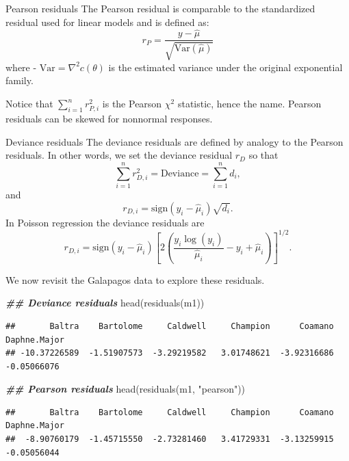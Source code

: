 \documentclass[
  ignorenonframetext,
]{beamer}
\newenvironment{Shaded}{\begin{snugshade}}{\end{snugshade}}
\newcommand{\DocumentationTok}[1]{\textcolor[rgb]{0.56,0.35,0.01}{\textbf{\textit{#1}}}}
\newcommand{\FunctionTok}[1]{\textcolor[rgb]{0.00,0.00,0.00}{#1}}
\newcommand{\NormalTok}[1]{#1}
\newcommand{\StringTok}[1]{\textcolor[rgb]{0.31,0.60,0.02}{#1}}
\begin{document}
\begin{frame}{Pearson residuals}
\protect\hypertarget{pearson-residuals}{}
The Pearson residual is comparable to the standardized residual used for
linear models and is defined as: \[
  r_P = \frac{y - \hat\mu}{\sqrt{\mathrm{Var}(\hat\mu)}}
\] where - \(\mathrm{Var} = \nabla^2 c(\theta)\) is the estimated
variance under the original exponential family.

\vspace{12pt}

Notice that \(\sum_{i=1}^n r_{P,i}^2\) is the Pearson \(\chi^2\)
statistic, hence the name. Pearson residuals can be skewed for nonnormal
responses.
\end{frame}

\begin{frame}{Deviance residuals}
\protect\hypertarget{deviance-residuals}{}
The deviance residuals are defined by analogy to the Pearson residuals.
In other words, we set the deviance residual \(r_D\) so that \[
  \sum_{i=1}^n r_{D,i}^2 = \text{Deviance} = \sum_{i=1}^n d_i,
\] and \[
  r_{D,i} = \text{sign}(y_i - \hat\mu_i)\sqrt{d_i}.
\] In Poisson regression the deviance residuals are \[
  r_{D,i} = \text{sign}(y_i - \hat\mu_i)\left[2\left(\frac{y_i\log(y_i)}{\hat\mu_i} - y_i + \hat\mu_i\right)\right]^{1/2}.
\]
\end{frame}

\begin{frame}[fragile]{}
\protect\hypertarget{section-18}{}
We now revisit the Galapagos data to explore these residuals.

\vspace{12pt}
\tiny

\begin{Shaded}
\begin{Highlighting}[]
\DocumentationTok{\#\# Deviance residuals}
\FunctionTok{head}\NormalTok{(}\FunctionTok{residuals}\NormalTok{(m1))}
\end{Highlighting}
\end{Shaded}

\begin{verbatim}
##       Baltra    Bartolome     Caldwell     Champion      Coamano Daphne.Major 
## -10.37226589  -1.51907573  -3.29219582   3.01748621  -3.92316686  -0.05066076
\end{verbatim}

\begin{Shaded}
\begin{Highlighting}[]
\DocumentationTok{\#\# Pearson residuals}
\FunctionTok{head}\NormalTok{(}\FunctionTok{residuals}\NormalTok{(m1, }\StringTok{"pearson"}\NormalTok{))}
\end{Highlighting}
\end{Shaded}

\begin{verbatim}
##       Baltra    Bartolome     Caldwell     Champion      Coamano Daphne.Major 
##  -8.90760179  -1.45715550  -2.73281460   3.41729331  -3.13259915  -0.05056044
\end{verbatim}
\end{frame}
\end{document}
